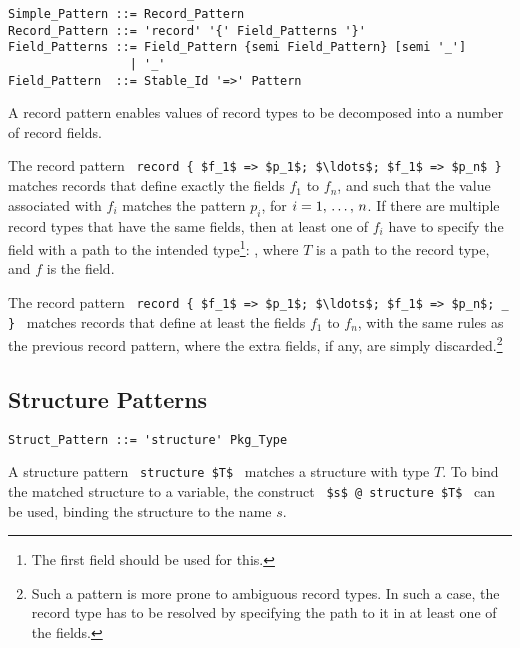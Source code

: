 \syntax\begin{lstlisting}
Simple_Pattern ::= Record_Pattern
Record_Pattern ::= 'record' '{' Field_Patterns '}'
Field_Patterns ::= Field_Pattern {semi Field_Pattern} [semi '_']
                 | '_'
Field_Pattern  ::= Stable_Id '=>' Pattern
\end{lstlisting}

A record pattern enables values of record types to be decomposed into a number of record fields. 

The record pattern ~\lstinline!record { $f_1$ => $p_1$; $\ldots$; $f_1$ => $p_n$ }!~ matches records that define exactly the fields $f_1$ to $f_n$, and such that the value associated with $f_i$ matches the pattern $p_i$, for $i = 1 ,\, \ldots ,\, n$. If there are multiple record types that have the same fields, then at least one of $f_i$ have to specify the field with a path to the intended type\footnote{The first field should be used for this.}: , where $T$ is a path to the record type, and $f$ is the field. 

The record pattern ~\lstinline!record { $f_1$ => $p_1$; $\ldots$; $f_1$ => $p_n$; _ }!~ matches records that define at least the fields $f_1$ to $f_n$, with the same rules as the previous record pattern, where the extra fields, if any, are simply discarded.\footnote{Such a pattern is more prone to ambiguous record types. In such a case, the record type has to be resolved by specifying the path to it in at least one of the fields.}





\subsection{Structure Patterns}
\label{sec:structure-patterns}

\syntax\begin{lstlisting}
Struct_Pattern ::= 'structure' Pkg_Type
\end{lstlisting}

A structure pattern ~\lstinline!structure $T$!~ matches a structure with type $T$. To bind the matched structure to a variable, the construct ~\lstinline!$s$ @ structure $T$!~ can be used, binding the structure to the name $s$. 










